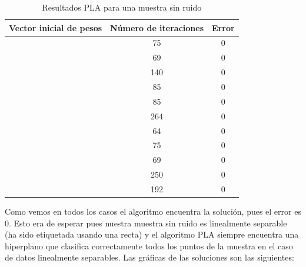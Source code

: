 \documentclass[a4]{article}
\begin{document}
\begin{table}[H]
	\begin{center}
	\begin{tabular}{|c|c|c|}
		\hline
		\textbf{Vector inicial de pesos} & \textbf{Número de iteraciones } & \textbf{Error} \\ \hline
		[0,0,0] & 75 & 0 \\ \hline
		[ 0.48432, 0.65005 0.14394 ] & 69 & 0 \\ \hline
		[ 0.30579 , 0.88692, 0.88684 ] & 140 & 0 \\ \hline
		[ 0.51521, 0.26708 , 0.88034] & 85 & 0 \\ \hline
		[ 0.49798, 0.33343 , 0.89469] & 85 & 0 \\ \hline
		[ 0.20448 , 0.8196, 0.83883 ] & 264 & 0 \\ \hline
		[ 0.52279, 0.16193, 0.94897] & 64 & 0 \\ \hline
		[ 0.05944 , 0.88649 , 0.57434 ] & 75 & 0 \\ \hline
		[ 0.37884, 0.6409 , 0.1278 ] & 69 & 0 \\ \hline
		[ 0.4067, 0.35641 , 0.15115] & 250 & 0 \\ \hline
		[ 0.85647, 0.102, 0.95312] & 192 & 0 \\ \hline
	\end{tabular}
	\label{tab:tabla1}
	\caption{Resultados PLA para una muestra sin ruido}
	\end{center}
\end{table}

Como vemos en todos los casos el algoritmo encuentra la solución, pues el error es 0. Esto era de esperar pues nuestra muestra sin ruido es linealmente separable (ha sido etiquetada usando una recta) y el algoritmo PLA siempre encuentra una hiperplano que clasifica correctamente todos los puntos de la muestra en el caso de datos linealmente separables. Las gráficas de las soluciones son las siguientes:
\end{document}
